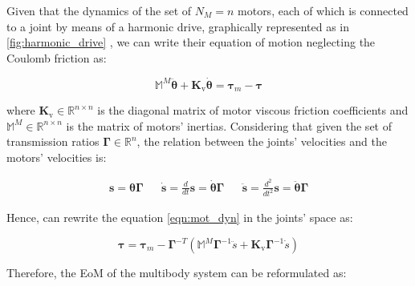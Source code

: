 Given that the dynamics of the set of $N _M = n$ motors, each of which is connected to a joint by means of a harmonic drive, graphically represented as in \cref{fig:harmonic_drive} \citep{folga2010}, we can write their equation of motion neglecting the Coulomb friction as:

\begin{equation}
    \mathbb{M} ^M \ddot{\boldsymbol{\theta}} + \mathbf{K}_{\mathrm{v}} \dot{\boldsymbol{\theta}} = \boldsymbol{\tau}_m - \boldsymbol{\tau}
    \label{eqn:mot_dyn}
\end{equation}

where $\mathbf{K}_{\mathrm{v}} \in \mathbb{R}^{n\times n}$ is the diagonal matrix of motor viscous friction coefficients and $\mathbb{M}^M \in \mathbb{R}^{n \times n}$ is the matrix of motors' inertias. Considering that given the set of transmission ratios $\boldsymbol{\Gamma} \in \mathbb{R}^n$, the relation between the joints' velocities and the motors' velocities is:

\begin{align}
    \mathbf{s} = \boldsymbol{\theta} \boldsymbol{\Gamma} &  & \dot{\mathbf{s}} = \frac{d}{dt} \mathbf{s} = \dot{\boldsymbol{\theta}} \boldsymbol{\Gamma} &  & \ddot{\mathbf{s}} = \frac{d^2}{dt^2} \mathbf{s} = \ddot{\boldsymbol{\theta}} \boldsymbol{\Gamma}
\end{align}

Hence, can rewrite the equation \cref{eqn:mot_dyn} in the joints' space as:

\begin{equation}
    \label{eqn:mot_dyn_jointspace}
    \boldsymbol{\tau} = \boldsymbol{\tau}_m - \boldsymbol{\Gamma} ^{-T} (\mathbb{M} ^M\boldsymbol{\Gamma} ^{-1} \ddot{s} + \mathbf{K}_{\mathrm{v}} \boldsymbol{\Gamma} ^{-1}\dot{s})
\end{equation}

Therefore, the \ac{EoM} of the multibody system can be reformulated as:

